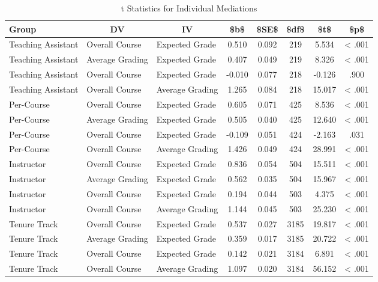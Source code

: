 \documentclass[man]{apa6}
\theoremstyle{definition}
\theoremstyle{definition}
\theoremstyle{definition}
\theoremstyle{remark}
\begin{document}
\begin{table}[tbp]
\begin{center}
\begin{threeparttable}
\caption{\label{tab:table-med-split}t Statistics for Individual Mediations}
\begin{tabular}{lllccccc}
\toprule
Group & \multicolumn{1}{c}{DV} & \multicolumn{1}{c}{IV} & \multicolumn{1}{c}{\$b\$} & \multicolumn{1}{c}{\$SE\$} & \multicolumn{1}{c}{\$df\$} & \multicolumn{1}{c}{\$t\$} & \multicolumn{1}{c}{\$p\$}\\
\midrule
Teaching Assistant & Overall Course & Expected Grade & 0.510 & 0.092 & 219 & 5.534 & < .001\\
Teaching Assistant & Average Grading & Expected Grade & 0.407 & 0.049 & 219 & 8.326 & < .001\\
Teaching Assistant & Overall Course & Expected Grade & -0.010 & 0.077 & 218 & -0.126 & .900\\
Teaching Assistant & Overall Course & Average Grading & 1.265 & 0.084 & 218 & 15.017 & < .001\\
Per-Course & Overall Course & Expected Grade & 0.605 & 0.071 & 425 & 8.536 & < .001\\
Per-Course & Average Grading & Expected Grade & 0.505 & 0.040 & 425 & 12.640 & < .001\\
Per-Course & Overall Course & Expected Grade & -0.109 & 0.051 & 424 & -2.163 & .031\\
Per-Course & Overall Course & Average Grading & 1.426 & 0.049 & 424 & 28.991 & < .001\\
Instructor & Overall Course & Expected Grade & 0.836 & 0.054 & 504 & 15.511 & < .001\\
Instructor & Average Grading & Expected Grade & 0.562 & 0.035 & 504 & 15.967 & < .001\\
Instructor & Overall Course & Expected Grade & 0.194 & 0.044 & 503 & 4.375 & < .001\\
Instructor & Overall Course & Average Grading & 1.144 & 0.045 & 503 & 25.230 & < .001\\
Tenure Track & Overall Course & Expected Grade & 0.537 & 0.027 & 3185 & 19.817 & < .001\\
Tenure Track & Average Grading & Expected Grade & 0.359 & 0.017 & 3185 & 20.722 & < .001\\
Tenure Track & Overall Course & Expected Grade & 0.142 & 0.021 & 3184 & 6.891 & < .001\\
Tenure Track & Overall Course & Average Grading & 1.097 & 0.020 & 3184 & 56.152 & < .001\\
\bottomrule
\end{tabular}
\end{threeparttable}
\end{center}
\end{table}
\end{document}
